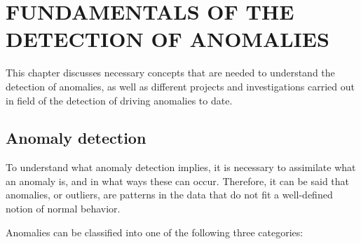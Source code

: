 
\chapter{\uppercase{FUNDAMENTALS OF THE DETECTION OF ANOMALIES}}

\label{Capitulo 2}

This chapter discusses necessary concepts that are needed to understand the detection of anomalies, as well as different projects and investigations carried out in field of the detection of driving anomalies to date.

\section{Anomaly detection}

To understand what anomaly detection implies, it is necessary to assimilate what an anomaly is, and in what ways these can occur. Therefore, it can be said that anomalies, or outliers, are patterns in the data that do not fit a well-defined notion of normal behavior.

\vspace{5mm} %

Anomalies can be classified into one of the following three categories:

